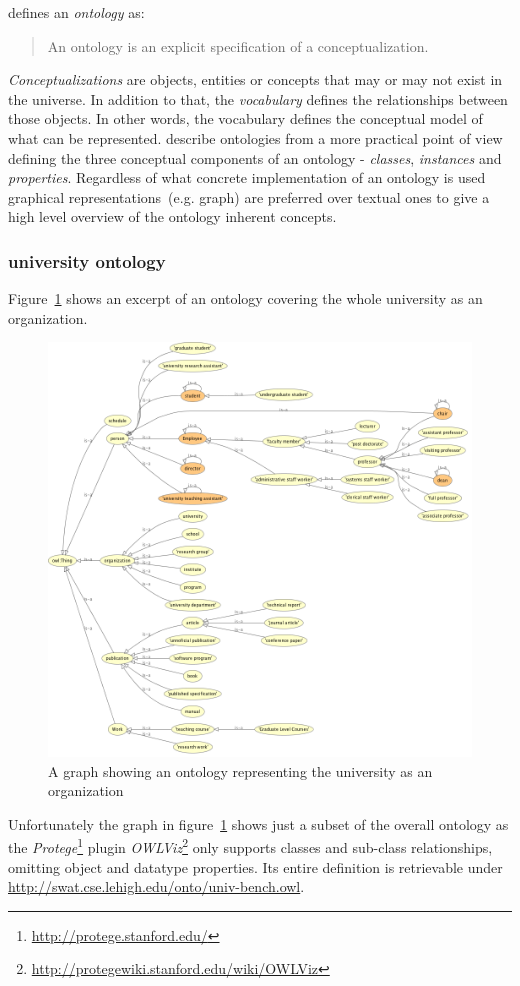 \documentclass{article}
\begin{document}
\citet{jour:gruber} defines an \textit{ontology} as:
\begin{quotation}
An ontology is an explicit specification of a conceptualization.
\end{quotation}
\textit{Conceptualizations} are objects, entities or concepts that may or may not exist in the universe. In addition to that, the \textit{vocabulary} defines the relationships between those objects. In other words, the vocabulary defines the conceptual model of what can be represented. 
\citet{jour:owl} describe ontologies from a more practical point of view defining the three conceptual components of an ontology - \textit{classes}, \textit{instances} and \textit{properties}. Regardless of what concrete implementation of an ontology is used graphical representations~(e.g. graph) are preferred over textual ones to give a high level overview of the ontology inherent concepts. 

\subsubsection{university ontology}
Figure~\ref{fig:owl-univ1} shows an excerpt of an ontology covering the whole university as an organization.
\begin{figure}[H]
	\centering \includegraphics*[width=.8\columnwidth]{owl-univ1.png}
	\caption{A graph showing an ontology representing the university as an organization}
	\label{fig:owl-univ1}
\end{figure}
Unfortunately the graph in figure~\ref{fig:owl-univ1} shows just a subset of the overall ontology as the \textit{Protege}\footnote{\url{http://protege.stanford.edu/}} plugin \textit{OWLViz}\footnote{\url{http://protegewiki.stanford.edu/wiki/OWLViz}} only supports classes and sub-class relationships, omitting object and datatype properties. Its entire definition is retrievable under \url{http://swat.cse.lehigh.edu/onto/univ-bench.owl}. 
\end{document}
